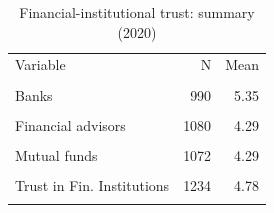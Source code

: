 \begin{table}[htbp]\centering\small
\caption{Financial-institutional trust: summary (2020)}
\label{tab:fin_trust_summary}
\begin{tabular}{lrr}\toprule
Variable & N & Mean \\\\ \midrule
Banks & 990 & 5.35 \\\\
Financial advisors & 1080 & 4.29 \\\\
Mutual funds & 1072 & 4.29 \\\\
Trust in Fin. Institutions & 1234 & 4.78 \\\\
\bottomrule
\end{tabular}\end{table}
